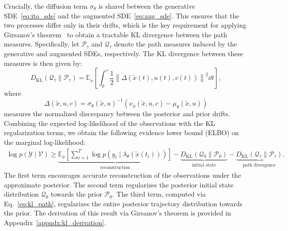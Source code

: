 \documentclass[preprint,12pt]{elsarticle}
\begin{document}
Crucially, the diffusion term $\sigma_\theta$ is shared between the generative SDE~\eqref{eq:ito_sde} and the augmented SDE~\eqref{eq:aug_sde}. This ensures that the two processes differ only in their drifts, which is the key requirement for applying Girsanov's theorem~\citep{girsanov1960transforming} to obtain a tractable KL divergence between the path measures. Specifically, let $\mathcal{P}_\tau$ and $\mathcal{Q}_\tau$ denote the path measures induced by the generative and augmented SDEs, respectively. The KL divergence between these measures is then given by:
\begin{equation}
    D_{\mathrm{KL}}(\mathcal{Q}_\tau \parallel \mathcal{P}_\tau) = \mathbb{E}_{\tilde{x}} \left[ \int_0^\tau \frac{1}{2} \left\| \Delta(\tilde{x}(t), u(t), c(t)) \right\|^2 \dd t \right],
    \label{eq:kl_path}
\end{equation}
where
\begin{equation}
    \Delta(\tilde{x}, u, c) = \sigma_\theta(\tilde{x}, u)^{-1} \left( \nu_\phi(\tilde{x}, u, c) - \mu_\theta(\tilde{x}, u) \right)
    \label{eq:delta}
\end{equation}
measures the normalized discrepancy between the posterior and prior drifts.
Combining the expected log-likelihood of the observations with the KL regularization terms, we obtain the following evidence lower bound (ELBO) on the marginal log-likelihood:
\begin{align}
    \log p(\mathcal{Y} \mid \mathcal{V}) \geq
    \underbrace{\mathbb{E}_{\tilde{x}} \left[ \sum_{i=1}^{T} \log p(y_i \mid \lambda_\theta(\tilde{x}(t_i))) \right]}_{\text{reconstruction}}
    - \underbrace{D_{\mathrm{KL}}(\mathcal{Q}_0 \| \mathcal{P}_0)}_{\text{initial state}}
    - \underbrace{D_{\mathrm{KL}}(\mathcal{Q}_\tau \| \mathcal{P}_\tau)}_{\text{path divergence}}.
    \label{eq:elbo}
\end{align}
The first term encourages accurate reconstruction of the observations under the approximate posterior. The second term regularizes the posterior initial state distribution $\mathcal{Q}_0$ towards the prior $\mathcal{P}_0$. The third term, computed via Eq.~\eqref{eq:kl_path}, regularizes the entire posterior trajectory distribution towards the prior. The derivation of this result via Girsanov's theorem is provided in Appendix~\ref{appndx:kl_derivation}.
\end{document}
